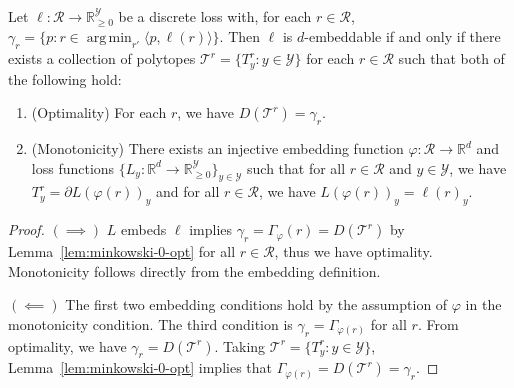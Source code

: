 \documentclass[anon]{colt2020} %
\newcommand{\reals}{\mathbb{R}}
\newcommand{\simplex}{\Delta_\Y}
\newcommand{\R}{\mathcal{R}}
\newcommand{\T}{\mathcal{T}}
\newcommand{\Y}{\mathcal{Y}}
\newcommand{\Opt}{\mathrm{Opt}}
\newcommand{\inprod}[2]{\langle #1, #2 \rangle}%
\DeclareMathOperator*{\argmin}{arg\,min}
\begin{document}

\begin{theorem} \label{thm:general-char}
  Let $\ell: \R \to \reals_{\geq 0}^{\Y}$ be a discrete loss with, for each $r \in \R$, $\gamma_r = \{p : r \in \argmin_{r'} \inprod{p}{\ell(r)}\}$.
  Then $\ell$ is $d$-embeddable if and only if there exists a collection of polytopes $\T^r = \{T^r_y : y \in \Y\}$ for each $r \in \R$ such that both of the following hold:
  \begin{enumerate}
    \item (Optimality) For each $r$, we have $D(\T^r) = \gamma_r$.
    \item (Monotonicity) There exists an injective embedding function $\varphi : \R \to \reals^d$ and loss functions $\{L_y : \reals^d \to \reals^\Y_{\geq 0}\}_{y \in \Y}$ such that for all $r \in \R$ and $y \in \Y$, we have $T^r_y = \partial L(\varphi(r))_y$ and for all $r \in \R$, we have $L(\varphi(r))_y = \ell(r)_y$.
  \end{enumerate}
\end{theorem}
\begin{proof}
  $(\implies)$ 
$L$ embeds $\ell$ implies $\gamma_{r} = \Gamma_\varphi(r) = D(\T^r)$ by Lemma~\ref{lem:minkowski-0-opt} for all $r \in \R$, thus we have optimality.
Monotonicity follows directly from the embedding definition. 
  
  $(\impliedby)$ The first two embedding conditions hold by the assumption of $\varphi$ in the monotonicity condition.
  The third condition is $\gamma_r = \Gamma_{\varphi(r)}$ for all $r$.
  From optimality, we have $\gamma_r = D(\T^r)$.
  Taking $\T^r = \{T^r_y : y \in \Y\}$, Lemma~\ref{lem:minkowski-0-opt} implies that $\Gamma_{\varphi(r)} = D(\T^r) = \gamma_r$.
\end{proof}
\end{document}
